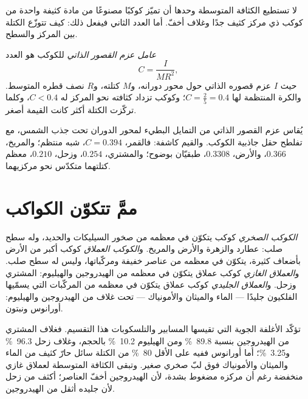 لا تستطيع الكثافة المتوسطة وحدها أن تميّز كوكبًا مصنوعًا من مادة كثيفة واحدة من كوكب ذي مركز كثيف جدًا وغلاف أخفّ. أما العدد الثاني فيفعل ذلك: كيف تتوزّع الكتلة بين المركز والسطح.

\begin{definition}\label{def:b1:comparative-planetology:moi}
\emph{عامل عزم القصور الذاتي} للكوكب هو العدد
\[
  C = \frac{I}{MR^2} ,
\]
حيث $I$ عزم قصوره الذاتي حول محور دورانه، و$M$ كتلته، و$R$ نصف قطره المتوسط. والكرة المنتظمة لها $C = \tfrac25 = 0.4$؛ وكوكب تزداد كثافته نحو المركز له $C < 0.4$، وكلما تركّزت الكتلة أكثر كانت القيمة أصغر.
\end{definition}

يُقاس عزم القصور الذاتي من التمايل البطيء لمحور الدوران تحت جذب الشمس، مع تفلطح حقل جاذبية الكوكب. والقيم كاشفة: فالقمر، $C = 0.394$، شبه منتظم؛ والمريخ، $0.366$، والأرض، $0.3308$، طبقيّان بوضوح؛ والمشتري، $0.254$، وزحل، $0.210$، معظم كتلتهما متكدّس نحو مركزيهما.

\section{ممَّ تتكوّن الكواكب}

\begin{definition}\label{def:b1:comparative-planetology:planet-types}
\emph{الكوكب الصخري} كوكب يتكوّن في معظمه من صخور السيليكات والحديد، وله سطح صلب: عطارد والزهرة والأرض والمريخ. و\emph{الكوكب العملاق} كوكب أكبر من الأرض بأضعاف كثيرة، يتكوّن في معظمه من عناصر خفيفة ومركّباتها، وليس له سطح صلب. و\emph{العملاق الغازي} كوكب عملاق يتكوّن في معظمه من الهيدروجين والهيليوم: المشتري وزحل. و\emph{العملاق الجليدي} كوكب عملاق يتكوّن في معظمه من المركّبات التي يسمّيها الفلكيون جليدًا --- الماء والميثان والأمونياك --- تحت غلاف من الهيدروجين والهيليوم: أورانوس ونبتون.
\end{definition}

تؤكّد الأغلفة الجوية التي تقيسها المسابير والتلسكوبات هذا التقسيم. فغلاف المشتري من الهيدروجين بنسبة \qty{89.8}{\percent} ومن الهيليوم \qty{10.2}{\percent} بالحجم، وغلاف زحل \qty{96.3}{\percent} و\qty{3.25}{\percent}؛ أما أورانوس ففيه على الأقل \qty{80}{\percent} من الكتلة سائل حارّ كثيف من الماء والميثان والأمونياك فوق لبّ صخري صغير. وتبقى الكثافة المتوسطة لعملاق غازي منخفضة رغم أن مركزه مضغوط بشدة، لأن الهيدروجين أخفّ العناصر؛  أكثف من زحل لأن جليده أثقل من الهيدروجين.


